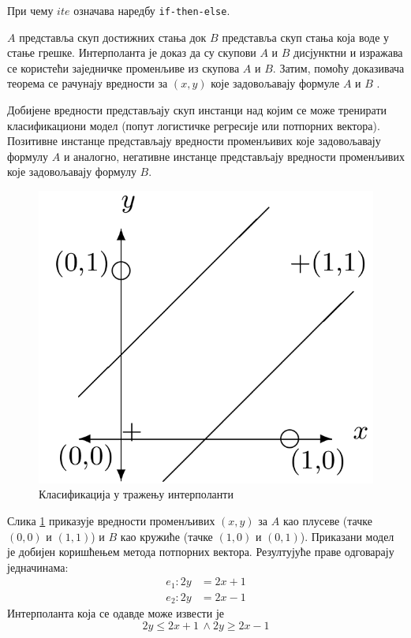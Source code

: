 \documentclass[a4paper]{article}
\begin{document}
{При чему $ite$ означава наредбу \texttt{if-then-else}.

$A$ представља скуп достижних стања док $B$ представља скуп стања која воде у стање грешке. Интерполанта је доказ да су
скупови $A$ и $B$ дисјунктни и изражава се користећи заједничке променљиве из скупова $A$ и $B$. Затим, помоћу доказивача теорема се рачунају вредности за $(x, y)$ које задовољавају формуле $A$ и $B$ \cite{Sharma_interpolantsas}.

Добијене вредности представљају скуп инстанци над којим се може тренирати класификациони модел (попут логистичке регресије или потпорних вектора).
Позитивне инстанце представљају вредности променљивих које задовољавају формулу $A$ и аналогно, негативне инстанце представљају вредности
променљивих које задовољавају формулу $B$.

\begin{figure}[h!]
\begin{center}
\includegraphics[scale=0.15]{./slike/interpolant.png}
\end{center}
\caption{Класификација у тражењу интерполанти}
\label{fig:interpolant_svm}
\end{figure}

Слика \ref{fig:interpolant_svm} приказује вредности променљивих $(x, y)$ за $A$ као плусеве (тачке $(0, 0)$ и $(1, 1)$)
и $B$ као кружиће (тачке $(1, 0)$ и $(0, 1)$). Приказани модел је добијен коришћењем метода потпорних вектора. Резултујуће праве одговарају једначинама:
\begin{equation*}
\begin{split}
    e_1: 2y &= 2x + 1 \\
    e_2: 2y &= 2x - 1
\end{split}
\end{equation*}
Интерполанта која се одавде може извести је
\begin{equation*}
2y \leq 2x + 1 \, \land 2y \geq 2x - 1
\end{equation*}

}
\end{document}
